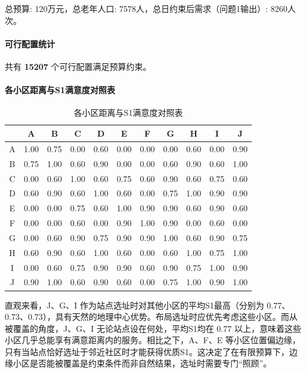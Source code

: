 \documentclass[UTF8]{ctexart}
\begin{document}
总预算: 120万元，总老年人口: 7578人，总日约束后需求（问题1输出）: 8260人次。

\paragraph{可行配置统计}
共有 \textbf{15207} 个可行配置满足预算约束。

\paragraph{各小区距离与S1满意度对照表}

\begin{table}[H]
\centering
\caption{各小区距离与S1满意度对照表}
\renewcommand{\arraystretch}{1.3}
\begin{tabular}{|c|c|c|c|c|c|c|c|c|c|c|}
\hline
\textbf{} & \textbf{A} & \textbf{B} & \textbf{C} & \textbf{D} & \textbf{E} & \textbf{F} & \textbf{G} & \textbf{H} & \textbf{I} & \textbf{J} \\
\hline
A & 1.00 & 0.75 & 0.00 & 0.60 & 0.00 & 0.00 & 0.00 & 0.60 & 0.00 & 0.90 \\
B & 0.75 & 1.00 & 0.60 & 0.90 & 0.00 & 0.00 & 0.60 & 0.90 & 0.60 & 1.00 \\
C & 0.00 & 0.60 & 1.00 & 0.60 & 0.75 & 0.60 & 0.90 & 0.60 & 0.75 & 0.60 \\
D & 0.60 & 0.90 & 0.60 & 1.00 & 0.60 & 0.00 & 0.75 & 1.00 & 0.90 & 0.90 \\
E & 0.00 & 0.00 & 0.75 & 0.60 & 1.00 & 0.90 & 0.90 & 0.60 & 0.90 & 0.60 \\
F & 0.00 & 0.00 & 0.60 & 0.00 & 0.90 & 1.00 & 0.90 & 0.00 & 0.60 & 0.00 \\
G & 0.00 & 0.60 & 0.90 & 0.75 & 0.90 & 0.90 & 1.00 & 0.60 & 0.90 & 0.75 \\
H & 0.60 & 0.90 & 0.60 & 1.00 & 0.60 & 0.00 & 0.60 & 1.00 & 0.75 & 1.00 \\
I & 0.00 & 0.60 & 0.75 & 0.90 & 0.90 & 0.60 & 0.90 & 0.75 & 1.00 & 0.90 \\
J & 0.90 & 1.00 & 0.60 & 0.90 & 0.60 & 0.00 & 0.75 & 1.00 & 0.90 & 1.00 \\
\hline
\end{tabular}
\end{table}

直观来看，J、G、I 作为站点选址时对其他小区的平均S1最高（分别为 0.77、0.73、0.73），具有天然的地理中心优势。布局选址时应优先考虑这些小区。而从被覆盖的角度，J、G、I 无论站点设在何处，平均S1均在 0.77 以上，意味着这些小区几乎总能享有满意距离内的服务。相比之下，A、F、E 等小区位置偏边缘，只有当站点恰好选址于邻近社区时才能获得优质S1。这决定了在有限预算下，边缘小区是否能被覆盖是约束条件而非自然结果，选址时需要专门“照顾”。
\end{document}
